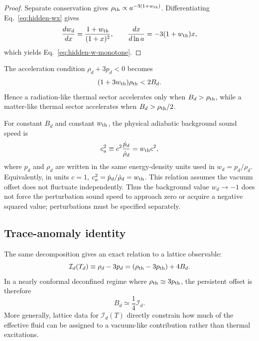 \documentclass[11pt]{article}
\theoremstyle{remark}
\begin{document}
\begin{proof}
Separate conservation gives $\rho_{\rm th}\propto a^{-3(1+w_{\rm th})}$. Differentiating Eq.~\eqref{eq:hidden-wx} gives
\begin{equation}
 \frac{dw_d}{dx}=\frac{1+w_{\rm th}}{(1+x)^2},
 \qquad
 \frac{dx}{d\ln a}=-3(1+w_{\rm th})x,
\end{equation}
which yields Eq.~\eqref{eq:hidden-w-monotone}.
\end{proof}

The acceleration condition $\rho_d+3p_d<0$ becomes
\begin{equation}
 (1+3w_{\rm th})\rho_{\rm th}<2B_d.
 \label{eq:hidden-acc-threshold}
\end{equation}
Hence a radiation-like thermal sector accelerates only when $B_d>\rho_{\rm th}$, while a matter-like thermal sector accelerates when $B_d>\rho_{\rm th}/2$.

For constant $B_d$ and constant $w_{\rm th}$, the physical adiabatic background sound speed is
\begin{equation}
 c_a^2\equiv c^2\frac{\dot p_d}{\dot\rho_d}
 =w_{\rm th}c^2,
 \label{eq:hidden-soundspeed}
\end{equation}
where $p_d$ and $\rho_d$ are written in the same energy-density units used in $w_d=p_d/\rho_d$. Equivalently, in units $c=1$, $c_a^2=\dot p_d/\dot\rho_d=w_{\rm th}$. This relation assumes the vacuum offset does not fluctuate independently. Thus the background value $w_d\to-1$ does not force the perturbation sound speed to approach zero or acquire a negative squared value; perturbations must be specified separately.

\subsection{Trace-anomaly identity}
The same decomposition gives an exact relation to a lattice observable:
\begin{equation}
 \mathcal I_d(T_d)
 \equiv \rho_d-3p_d
 =\left(\rho_{\rm th}-3p_{\rm th}\right)+4B_d.
 \label{eq:hidden-trace-identity}
\end{equation}
In a nearly conformal deconfined regime where $\rho_{\rm th}\simeq3p_{\rm th}$, the persistent offset is therefore
\begin{equation}
 B_d\simeq \frac14\mathcal I_d.
\end{equation}
More generally, lattice data for $\mathcal I_d(T)$ directly constrain how much of the effective fluid can be assigned to a vacuum-like contribution rather than thermal excitations.
\end{document}
